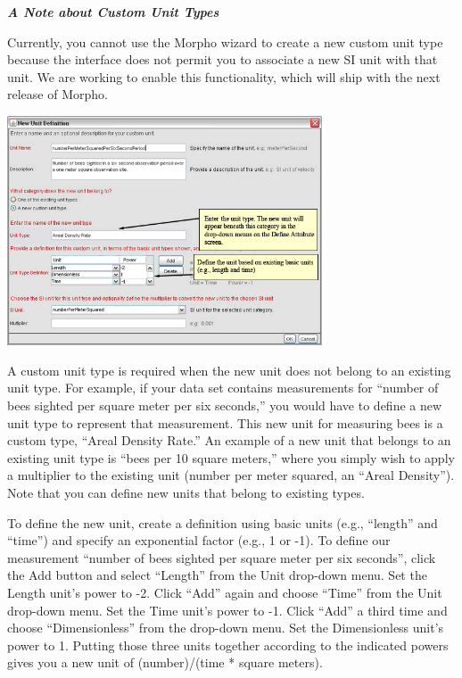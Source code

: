 \begin{shaded}
  \label{box:custom-units}
  \emph{\textbf{A Note about Custom Unit Types}}

  Currently, you cannot use the Morpho wizard to create a new custom
  unit type because the interface does not permit you to associate a new
  SI unit with that unit. We are working to enable this functionality,
  which will ship with the next release of Morpho.

  \begin{center}
      \includegraphics[width=0.7\textwidth]{images/wizard-table-attribute-newunit-newtype.jpg}
  \end{center}

  A custom unit type is required when the new unit does not belong to an
  existing unit type. For example, if your data set contains
  measurements for ``number of bees sighted per square meter per six
  seconds,'' you would have to define a new unit type to represent that
  measurement. This new unit for measuring bees is a custom type,
  ``Areal Density Rate.'' An example of a new unit that belongs to an
  existing unit type is ``bees per 10 square meters,'' where you simply
  wish to apply a multiplier to the existing unit (number per meter
  squared, an ``Areal Density''). Note that you can define new units
  that belong to existing types.


  To define the new unit, create a definition using basic units (e.g.,
  ``length'' and ``time'') and specify an exponential factor (e.g., 1 or
  -1). To define our measurement ``number of bees sighted per square
  meter per six seconds'', click the Add button and select ``Length''
  from the Unit drop-down menu. Set the Length unit's power to -2. Click
  ``Add'' again and choose ``Time'' from the Unit drop-down menu. Set
  the Time unit's power to -1. Click ``Add'' a third time and choose
  ``Dimensionless'' from the drop-down menu. Set the Dimensionless
  unit's power to 1. Putting those three units together according to the
  indicated powers gives you a new unit of (number)/(time * square
  meters). 


\end{shaded}
